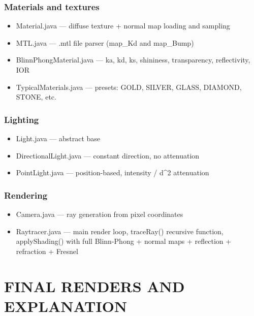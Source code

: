 \documentclass[
]{article}
\begin{document}
\subsubsection{\texorpdfstring{\textbf{Materials and
textures}}{Materials and textures}}\label{materials-and-textures}

\begin{itemize}
\item
  Material.java --- diffuse texture + normal map loading and sampling
\item
  MTL.java --- .mtl file parser (map\_Kd and map\_Bump)
\item
  BlinnPhongMaterial.java --- ka, kd, ks, shininess, transparency,
  reflectivity, IOR
\item
  TypicalMaterials.java --- presets: GOLD, SILVER, GLASS, DIAMOND,
  STONE, etc.
\end{itemize}

\subsubsection{\texorpdfstring{\textbf{Lighting}}{Lighting}}\label{lighting}

\begin{itemize}
\item
  Light.java --- abstract base
\item
  DirectionalLight.java --- constant direction, no attenuation
\item
  PointLight.java --- position-based, intensity / d\^{}2 attenuation
\end{itemize}

\subsubsection{\texorpdfstring{\textbf{Rendering}}{Rendering}}\label{rendering}

\begin{itemize}
\item
  Camera.java --- ray generation from pixel coordinates
\item
  Raytracer.java --- main render loop, traceRay() recursive function,
  applyShading() with full Blinn-Phong + normal maps + reflection +
  refraction + Fresnel
\end{itemize}

\section{FINAL RENDERS AND
EXPLANATION}\label{final-renders-and-explanation}
\end{document}
